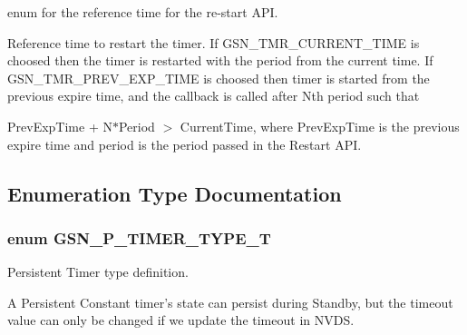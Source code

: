 enum for the reference time for the re-\/start API. 

Reference time to restart the timer. If GSN\_\-TMR\_\-CURRENT\_\-TIME is choosed then the timer is restarted with the period from the current time. If GSN\_\-TMR\_\-PREV\_\-EXP\_\-TIME is choosed then timer is started from the previous expire time, and the callback is called after Nth period such that

PrevExpTime + N$\ast$Period $>$ CurrentTime, where PrevExpTime is the previous expire time and period is the period passed in the Restart API. 

\subsection{Enumeration Type Documentation}
\hypertarget{a00671_gadc3540874fb3842b2eb56edd0c82945b}{
\subsubsection[{GSN\_\-P\_\-TIMER\_\-TYPE\_\-T}]{\setlength{\rightskip}{0pt plus 5cm}enum {\bf GSN\_\-P\_\-TIMER\_\-TYPE\_\-T}}}
\label{a00671_gadc3540874fb3842b2eb56edd0c82945b}


Persistent Timer type definition. 

A Persistent Constant timer's state can persist during Standby, but the timeout value can only be changed if we update the timeout in NVDS.

